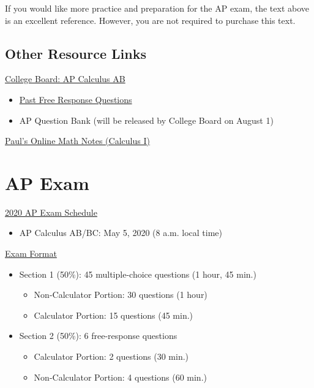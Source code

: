 \documentclass[12pt,fleqn]{article}
\providecommand{\tightlist}{%
  \setlength{\itemsep}{0pt}\setlength{\parskip}{0pt}}
\begin{document}
If you would like more practice and preparation for the AP exam, the text above is an excellent reference. However, you are not required to purchase this text.

\hypertarget{other-resource-links}{%
\subsection{Other Resource Links}\label{other-resource-links}}

\href{https://apcentral.collegeboard.org/courses/ap-calculus-ab/course}{College Board: AP Calculus AB}

\begin{itemize}
\tightlist
\item
  \href{https://apcentral.collegeboard.org/courses/ap-calculus-ab/exam/past-exam-questions}{Past Free Response Questions}
\item
  AP Question Bank (will be released by College Board on August 1)
\end{itemize}

\href{http://tutorial.math.lamar.edu/Classes/CalcI/CalcI.aspx}{Paul's Online Math Notes (Calculus I)}

\hypertarget{ap-exam}{%
\section{AP Exam}\label{ap-exam}}

\href{https://apcentral.collegeboard.org/courses/exam-dates-and-fees/exam-dates-2020}{2020 AP Exam Schedule}

\begin{itemize}
\tightlist
\item
  AP Calculus AB/BC: May 5, 2020 (8 a.m. local time)
\end{itemize}

\href{https://apcentral.collegeboard.org/courses/ap-calculus-ab/exam}{Exam Format}

\begin{itemize}
\tightlist
\item
  Section 1 (50\%): 45 multiple-choice questions (1 hour, 45 min.)

  \begin{itemize}
  \tightlist
  \item
    Non-Calculator Portion: 30 questions (1 hour)
  \item
    Calculator Portion: 15 questions (45 min.)
  \end{itemize}
\item
  Section 2 (50\%): 6 free-response questions

  \begin{itemize}
  \tightlist
  \item
    Calculator Portion: 2 questions (30 min.)
  \item
    Non-Calculator Portion: 4 questions (60 min.)
  \end{itemize}
\end{itemize}
\end{document}
